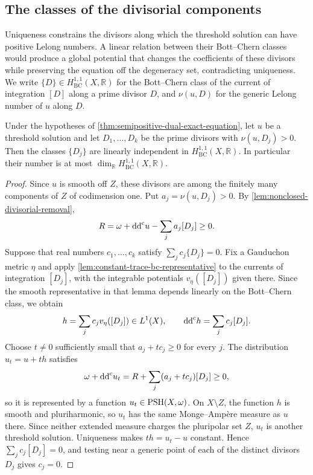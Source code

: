 \subsection{The classes of the divisorial components}

Uniqueness constrains the divisors along which the threshold solution can have positive Lelong numbers. A linear relation between their Bott--Chern classes would produce a global potential that changes the coefficients of these divisors while preserving the equation off the degeneracy set, contradicting uniqueness. We write $\{D\}\in H^{1,1}_{\mathrm{BC}}(X,\mathbb R)$ for the Bott--Chern class of the current of integration $[D]$ along a prime divisor $D$, and $\nu(u,D)$ for the generic Lelong number of $u$ along $D$.

\begin{corollary}\label{cor:semipositive-dual-divisor-independence}
Under the hypotheses of \cref{thm:semipositive-dual-exact-equation}, let $u$ be a threshold solution and let $D_1,\ldots,D_k$ be the prime divisors with $\nu(u,D_j)>0$. Then the classes $\{D_j\}$ are linearly independent in $H^{1,1}_{\mathrm{BC}}(X,\mathbb R)$. In particular their number is at most $\dim_{\mathbb R}H^{1,1}_{\mathrm{BC}}(X,\mathbb R)$.
\end{corollary}
\begin{proof}
Since $u$ is smooth off $Z$, these divisors are among the finitely many components of $Z$ of codimension one. Put $a_j=\nu(u,D_j)>0$. By \cref{lem:nonclosed-divisorial-removal},
\[
 R=\omega+\mathrm{dd}^{\mathrm{c}} u-\sum_j a_j[D_j]\geq0.
\]
Suppose that real numbers $c_1,\ldots,c_k$ satisfy $\sum_j c_j\{D_j\}=0$. Fix a Gauduchon metric $\eta$ and apply \cref{lem:constant-trace-bc-representative} to the currents of integration $[D_j]$, with the integrable potentials $v_\eta([D_j])$ given there. Since the smooth representative in that lemma depends linearly on the Bott--Chern class, we obtain
\[
 h=\sum_j c_j v_\eta([D_j])\in L^1(X),\qquad
 \mathrm{dd}^{\mathrm{c}} h=\sum_j c_j[D_j].
\]
Choose $t\ne0$ sufficiently small that $a_j+tc_j\geq0$ for every $j$. The distribution $u_t=u+th$ satisfies
\[
 \omega+\mathrm{dd}^{\mathrm{c}} u_t=R+\sum_j(a_j+tc_j)[D_j]\geq0,
\]
so it is represented by a function $u_t\in\mathrm{PSH}(X,\omega)$. On $X\setminus Z$, the function $h$ is smooth and pluriharmonic, so $u_t$ has the same Monge--Amp\`ere measure as $u$ there. Since neither extended measure charges the pluripolar set $Z$, $u_t$ is another threshold solution. Uniqueness makes $th=u_t-u$ constant. Hence $\sum_jc_j[D_j]=0$, and testing near a generic point of each of the distinct divisors $D_j$ gives $c_j=0$.
\end{proof}
